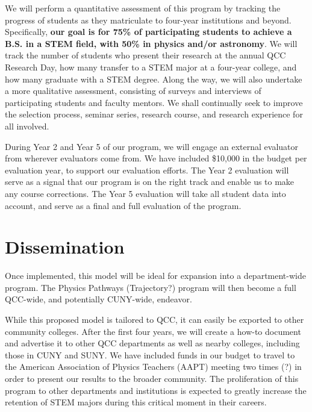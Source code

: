 \documentclass[12pt]{article}
\newcommand\new[1]{{\color{blue}#1}}
\begin{document}

We will perform a quantitative assessment of this program by tracking the progress of students as they matriculate to four-year institutions and beyond. Specifically, {\bf our goal is for 75\% of participating students to achieve a B.S. in a STEM field, with 50\% in physics and/or astronomy}. We will track the number of students who present their research at the annual QCC Research Day, how many transfer to a STEM major at a four-year college, and how many graduate with a STEM degree.  Along the way, we will also undertake a more qualitative assessment, consisting of surveys and interviews of participating students and faculty mentors.  We shall continually seek to improve the selection process, seminar series, research course, and research experience for all involved.

During Year 2 and Year 5 of our program, we will engage an external evaluator from \new{wherever evaluators come from.}  We have included \$10,000 in the budget per evaluation year, to support our evaluation efforts.  The Year 2 evaluation will serve as a signal that our program is on the right track and enable us to make any course corrections.  The Year 5 evaluation will take all student data into account, and serve as a final and full evaluation of the program.

\section{Dissemination}

Once implemented, this model will be ideal for expansion into a department-wide program.  
The Physics Pathways (Trajectory?) program will then become a full QCC-wide, and potentially CUNY-wide, endeavor.

While this proposed model is tailored to QCC, it can easily be exported to other community colleges.  After the first four years, we will create a how-to document and advertise it to other QCC departments as well as nearby colleges, including those in CUNY and SUNY.  We have included funds in our budget to travel to the American Association of Physics Teachers (AAPT) meeting \new{two times (?)} in order to present our results to the broader community.  The proliferation of this program to other departments and institutions is expected to greatly increase the retention of STEM majors during this critical moment in their careers.
\end{document}
